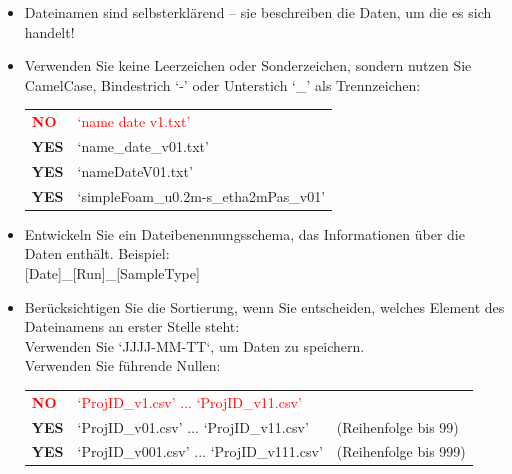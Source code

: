 \begin{itemize}
  \item Dateinamen sind selbsterklärend – sie beschreiben die Daten,
        um die es sich handelt!
  \item Verwenden Sie keine Leerzeichen oder Sonderzeichen, sondern nutzen Sie
        CamelCase, Bindestrich ‘-’ oder Unterstich ‘\_’ als Trennzeichen: \\
        \begin{tabular}{ll}
          \textcolor{red}{\textbf{NO}}  & \textcolor{red}{‘name date v1.txt’} \\
          \textbf{YES} & ‘name\_date\_v01.txt’ \\
          \textbf{YES} & ‘nameDateV01.txt’ \\
          \textbf{YES} & ‘simpleFoam\_u0.2m-s\_etha2mPas\_v01’ \\
        \end{tabular}
  \item Entwickeln Sie ein Dateibenennungsschema, das Informationen über die
        Daten enthält. Beispiel: \\
        {[Date]}\_{[Run]}\_{[SampleType]}
  \item Berücksichtigen Sie die Sortierung, wenn Sie entscheiden, welches
        Element des Dateinamens an erster Stelle steht: \\
        Verwenden Sie ‘JJJJ-MM-TT‘, um Daten zu speichern. \\
        Verwenden Sie führende Nullen: \\
        \begin{tabular}{lll}
          \textcolor{red}{\textbf{NO}}  & \textcolor{red}{‘ProjID\_v1.csv’  	...  	‘ProjID\_v11.csv’} & \\
          \textbf{YES} & ‘ProjID\_v01.csv’ 	... 	‘ProjID\_v11.csv’
             & (Reihenfolge bis 99) \\
          \textbf{YES} & ‘ProjID\_v001.csv’ 	...	‘ProjID\_v111.csv’
             & (Reihenfolge bis 999) \\
        \end{tabular}
\end{itemize}

